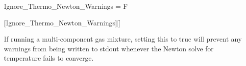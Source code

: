
\begin{nmldescitem}
Ignore_Thermo_Newton_Warnings = F
\end{nmldescitem}
[Ignore\_Thermo\_Newton\_Warnings][]

\begin{nmldescbody}
If running a multi-component gas mixture, setting this to true will prevent
any warnings from being written to stdout whenever the Newton solve for
temperature fails to converge.
\end{nmldescbody}


